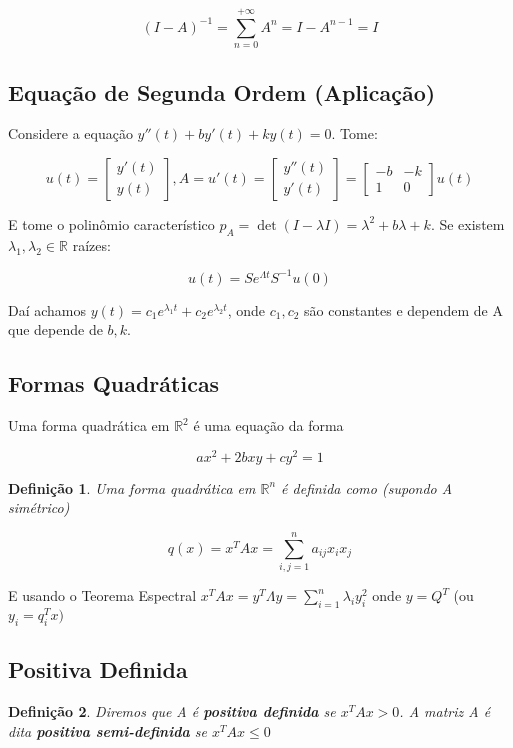 \documentclass[12pt]{article}
\newtheorem{definition}{Definição}
\begin{document}
$$(I-A)^{-1} = \sum_{n=0}^{+ \infty} A^n = I - A^{n-1} = I$$

\subsection*{Equação de Segunda Ordem (Aplicação)}
Considere a equação $y''(t) + b y'(t) + k y(t) = 0$. Tome:

$$u(t) = \left[ \begin{array}{c}
    y'(t)\\
    y(t) 
\end{array} \right], A = u'(t) = \left[ \begin{array}{c}
    y''(t) \\
    y'(t)
\end{array} \right] = \left[ \begin{array}{cc}
    -b & -k \\
    1 & 0
\end{array} \right] u(t)$$

E tome o polinômio característico $p_A = \det(I - \lambda I) = \lambda^2 + b \lambda + k$. Se existem $\lambda_1, \lambda_2 \in \mathbb{R}$ raízes:

$$u(t) = S e^{\Lambda t} S^{-1} u(0)$$

Daí achamos $y(t) = c_1 e^{\lambda_1 t} + c_2 e^{\lambda_2 t}$, onde $c_1, c_2$ são constantes e dependem de A que depende de $b, k$.

\subsection*{Formas Quadráticas}
Uma forma quadrática em $\mathbb{R}^2$ é uma equação da forma

$$a x^2 + 2b x y + c y^2 = 1$$

\begin{definition}
    Uma forma quadrática em $\mathbb{R}^n$ é definida como (supondo A simétrico)
    
    $$q(x) = x^T A x = \sum_{i,j = 1}^n a_{i j} x_i x_j$$
\end{definition}

E usando o Teorema Espectral $x^T A x = y^T \Lambda y = \sum_{i = 1}^n \lambda_i y_i^2$ onde $y = Q^T$ (ou $y_i = q_i^T x)$

\subsection*{Positiva Definida}
\begin{definition}
    Diremos que A é \textbf{positiva definida} se $x^T A x > 0$. A matriz A é dita \textbf{positiva semi-definida} se $x^T A x \leq 0$
\end{definition}
\end{document}
